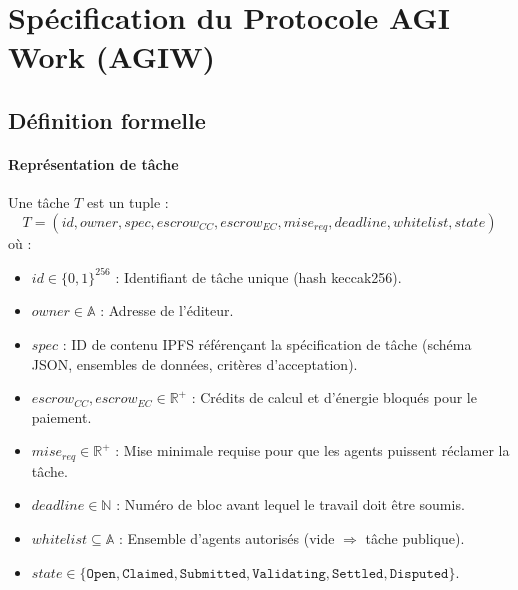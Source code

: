 \documentclass[11pt]{article}
\begin{document}
\section{Spécification du Protocole AGI Work (AGIW)}
\label{sec:agiw-spec}

\subsection{Définition formelle}
\paragraph{Représentation de tâche} Une tâche $T$ est un tuple :
\begin{equation}
T = (id, owner, spec, escrow_{CC}, escrow_{EC}, mise_{req}, deadline, whitelist, state)
\end{equation}
où :
\begin{itemize}[noitemsep]
  \item $id \in \{0,1\}^{256}$ : Identifiant de tâche unique (hash keccak256).
  \item $owner \in \mathbb{A}$ : Adresse de l'éditeur.
  \item $spec$ : ID de contenu IPFS référençant la spécification de tâche (schéma JSON, ensembles de données, critères d'acceptation).
  \item $escrow_{CC}, escrow_{EC} \in \mathbb{R}^+$ : Crédits de calcul et d'énergie bloqués pour le paiement.
  \item $mise_{req} \in \mathbb{R}^+$ : Mise minimale requise pour que les agents puissent réclamer la tâche.
  \item $deadline \in \mathbb{N}$ : Numéro de bloc avant lequel le travail doit être soumis.
  \item $whitelist \subseteq \mathbb{A}$ : Ensemble d'agents autorisés (vide $\Rightarrow$ tâche publique).
  \item $state \in \{\texttt{Open}, \texttt{Claimed}, \texttt{Submitted}, \texttt{Validating}, \texttt{Settled}, \texttt{Disputed}\}$.
\end{itemize}
\end{document}
